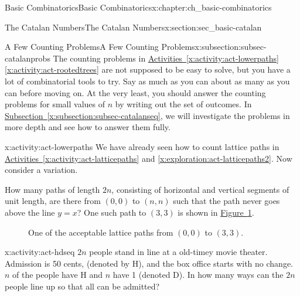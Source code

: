 \documentclass[oneside,10pt,]{book}
\numberwithin{equation}{chapter}
\begin{document}
\begin{chapterptx}{Basic Combinatorics}{}{Basic Combinatorics}{}{}{x:chapter:ch_basic-combinatorics}
\begin{sectionptx}{The Catalan Numbers}{}{The Catalan Numbers}{}{}{x:section:sec_basic-catalan}
\begin{introduction}{}
\end{introduction}%
%
%
\typeout{************************************************}
\typeout{************************************************}
%
\begin{subsectionptx}{A Few Counting Problems}{}{A Few Counting Problems}{}{}{x:subsection:subsec-catalanprobs}
The counting problems in \hyperref[x:activity:act-lowerpaths]{Activities~\ref{x:activity:act-lowerpaths}\textendash{}\ref{x:activity:act-rootedtrees}} are not supposed to be easy to solve, but you have a lot of combinatorial tools to try.  Say as much as you can about as many as you can before moving on.  At the very least, you should answer the counting problems for small values of \(n\) by writing out the set of outcomes.  In \hyperref[x:subsection:subsec-catalanseq]{Subsection~\ref{x:subsection:subsec-catalanseq}}, we will investigate the problems in more depth and see how to answer them fully.%
\begin{activity}{}{x:activity:act-lowerpaths}%
We have already seen how to count lattice paths in \hyperref[x:activity:act-latticepaths]{Activities~\ref{x:activity:act-latticepaths}} and \hyperref[x:exploration:act-latticepaths2]{\ref{x:exploration:act-latticepaths2}}.  Now consider a variation.%
\par
How many paths of length \(2n\), consisting of horizontal and vertical segments of unit length, are there from \((0, 0)\) to \((n, n)\) such that the path never goes above the line \(y = x\)? One such path to \((3, 3)\) is shown in \hyperref[x:figure:catalanpathex]{Figure~\ref{x:figure:catalanpathex}}.%
\begin{figure}
\centering
{
}
\caption{One of the acceptable lattice paths from \((0,0)\) to \((3,3)\).\label{x:figure:catalanpathex}}
\end{figure}
\end{activity}
\begin{activity}{}{x:activity:act-hdseq}%
\(2n\) people stand in line at a old-timey movie theater. Admission is 50 cents, (denoted by H), and the box office starts with no change. \(n\) of the people have H and \(n\) have \textdollar{}1 (denoted D). In how many ways can the \(2n\) people line up so that all can be admitted?%

\end{activity}
\end{subsectionptx}
\end{sectionptx}
\end{chapterptx}
\end{document}
